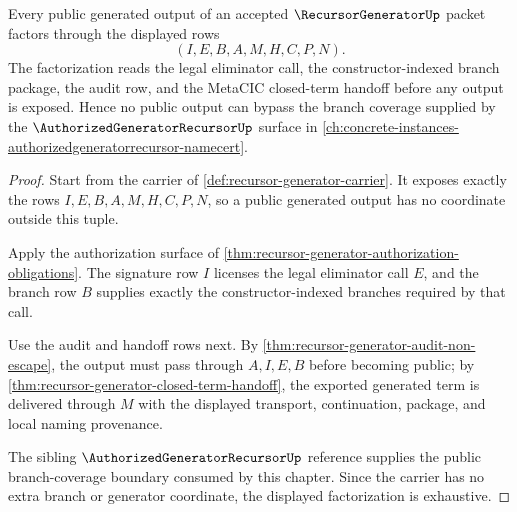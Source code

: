 \begin{theorem}
\label{thm:recursor-generator-authorized-output-factorization}
Every public generated output of an accepted $\RecursorGeneratorUp$ packet factors through the displayed rows
$$
(I,E,B,A,M,H,C,P,N).
$$
The factorization reads the legal eliminator call, the constructor-indexed branch package, the audit row, and the MetaCIC closed-term handoff before any output is exposed. Hence no public output can bypass the branch coverage supplied by the $\AuthorizedGeneratorRecursorUp$ surface in \autoref{ch:concrete-instances-authorizedgeneratorrecursor-namecert}.
\end{theorem}
\begin{proof}
Start from the carrier of \autoref{def:recursor-generator-carrier}. It exposes exactly the rows $I,E,B,A,M,H,C,P,N$, so a public generated output has no coordinate outside this tuple.

Apply the authorization surface of \autoref{thm:recursor-generator-authorization-obligations}. The signature row $I$ licenses the legal eliminator call $E$, and the branch row $B$ supplies exactly the constructor-indexed branches required by that call.

Use the audit and handoff rows next. By \autoref{thm:recursor-generator-audit-non-escape}, the output must pass through $A,I,E,B$ before becoming public; by \autoref{thm:recursor-generator-closed-term-handoff}, the exported generated term is delivered through $M$ with the displayed transport, continuation, package, and local naming provenance.

The sibling $\AuthorizedGeneratorRecursorUp$ reference supplies the public branch-coverage boundary consumed by this chapter. Since the carrier has no extra branch or generator coordinate, the displayed factorization is exhaustive.
\end{proof}

